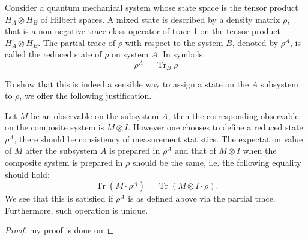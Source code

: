 Consider a quantum mechanical system whose state space is the tensor product $H_A \otimes H_B$ of Hilbert spaces. A mixed state is described by a density matrix $\rho$, that is a non-negative trace-class operator of trace 1 on the tensor product $H_A \otimes H_B$. The partial trace of $\rho$ with respect to the system $B$, denoted by $\rho^A$, is called the reduced state of $\rho$ on system $A$. In symbols,
\begin{equation}
    \rho^A=\operatorname{Tr}_B \rho
\end{equation}

To show that this is indeed a sensible way to assign a state on the $A$ subsystem to $\rho$, we offer the following justification. 

Let $M$ be an observable on the subsystem $A$, then the corresponding observable on the composite system is $M \otimes I$. However one chooses to define a reduced state $\rho^A$, there should be consistency of measurement statistics. The expectation value of $M$ after the subsystem $A$ is prepared in $\rho^A$ and that of $M \otimes I$ when the composite system is prepared in $\rho$ should be the same, i.e. the following equality should hold:
\begin{equation}
    \operatorname{Tr}\left(M \cdot \rho^A\right)=\operatorname{Tr}(M \otimes I \cdot \rho) .
\end{equation}
We see that this is satisfied if $\rho^A$ is as defined above via the partial trace. Furthermore, such operation is unique.

\begin{proof}
    my proof is done on
\end{proof}